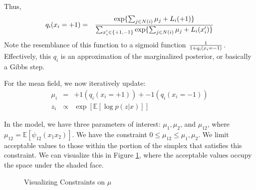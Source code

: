 \documentclass[twoside]{article}
\begin{document}
{Thus, 
\begin{eqnarray*}
q_i(x_i=+1) &=& { \exp\{ \sum_{j \in N(i)} \mu_j + L_i(+1) \}   \over \sum_{x_i^{\prime} \in \{ +1, -1\}} \exp \{ \sum_{j \in N(i)} \mu_j + L_i(x_i^{\prime}) \} }
\end{eqnarray*}
Note the resemblance of this function to a sigmoid function $1 \over 1+q_i(x_i=-1)$. Effectively, this $q_i$ is an approximation of the marginalized posterior, or basically a Gibbs step.

For the mean field, we now iteratively update:
\begin{eqnarray*}
\mu_i &=& +1 (q_i(x_i=+1)) + -1 (q_i(x_i=-1)) \\
z_i &\propto& \exp[ \mathbb{E}[ \log p(z|x)]]
\end{eqnarray*}

In the model, we have three parameters of interest: $\mu_1, \mu_2$, and $\mu_{12}$, where $\mu_{12}=\mathbb{E}[\psi_{12}(x_1 x_2)]$. We have the constraint $0 \leq \mu_{12} \leq \mu_1, \mu_2$. We limit acceptable values to those within the portion of the simplex that satisfies this constraint. We can visualize this in Figure \ref{mu}, where the acceptable values occupy the space under the shaded face. 

\begin{figure}[h!]
\begin{center}
\setlength{\fboxsep}{0pt}
\setlength{\fboxrule}{1pt}
\caption{Visualizing Constraints on $\mu$}
\label{mu}
\end{center}
\end{figure}


}
\end{document}
